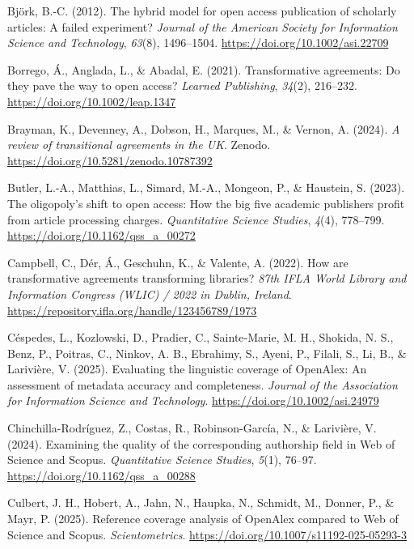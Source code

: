 \documentclass[a4paper,man,floatsintext,longtable,noextraspace,10pt]{apa6}
\newlength{\cslhangindent}
\newenvironment{CSLReferences}[2] %
{\begin{list}{}{%
  \setlength{\itemindent}{0pt}
  \setlength{\leftmargin}{0pt}
  \setlength{\parsep}{0pt}
  \ifodd #1
  \setlength{\leftmargin}{\cslhangindent}
  \setlength{\itemindent}{-1\cslhangindent}
  \fi
  \setlength{\itemsep}{#2\baselineskip}}}
{\end{list}}
\begin{document}
\begin{CSLReferences}{1}{0}
Björk, B.-C. (2012). The hybrid model for open access publication of
scholarly articles: A failed experiment? \emph{Journal of the American
Society for Information Science and Technology}, \emph{63}(8),
1496--1504. \url{https://doi.org/10.1002/asi.22709}

Borrego, Á., Anglada, L., \& Abadal, E. (2021). Transformative
agreements: Do they pave the way to open access? \emph{Learned
Publishing}, \emph{34}(2), 216--232.
\url{https://doi.org/10.1002/leap.1347}

Brayman, K., Devenney, A., Dobson, H., Marques, M., \& Vernon, A.
(2024). \emph{A review of transitional agreements in the {UK}}. Zenodo.
\url{https://doi.org/10.5281/zenodo.10787392}

Butler, L.-A., Matthias, L., Simard, M.-A., Mongeon, P., \& Haustein, S.
(2023). The oligopoly's shift to open access: How the big five academic
publishers profit from article processing charges. \emph{Quantitative
Science Studies}, \emph{4}(4), 778--799.
\url{https://doi.org/10.1162/qss_a_00272}

Campbell, C., Dér, Á., Geschuhn, K., \& Valente, A. (2022). How are
transformative agreements transforming libraries? \emph{87th IFLA World
Library and Information Congress (WLIC) / 2022 in Dublin, Ireland}.
\url{https://repository.ifla.org/handle/123456789/1973}

Céspedes, L., Kozlowski, D., Pradier, C., Sainte‐Marie, M. H., Shokida,
N. S., Benz, P., Poitras, C., Ninkov, A. B., Ebrahimy, S., Ayeni, P.,
Filali, S., Li, B., \& Larivière, V. (2025). Evaluating the linguistic
coverage of {OpenAlex}: An assessment of metadata accuracy and
completeness. \emph{Journal of the Association for Information Science
and Technology}. \url{https://doi.org/10.1002/asi.24979}

Chinchilla-Rodríguez, Z., Costas, R., Robinson-García, N., \& Larivière,
V. (2024). Examining the quality of the corresponding authorship field
in {Web of Science} and {Scopus}. \emph{Quantitative Science Studies},
\emph{5}(1), 76--97. \url{https://doi.org/10.1162/qss_a_00288}

Culbert, J. H., Hobert, A., Jahn, N., Haupka, N., Schmidt, M., Donner,
P., \& Mayr, P. (2025). Reference coverage analysis of {OpenAlex}
compared to {Web of Science} and {Scopus}. \emph{Scientometrics}.
\url{https://doi.org/10.1007/s11192-025-05293-3}


\end{CSLReferences}
\end{document}
